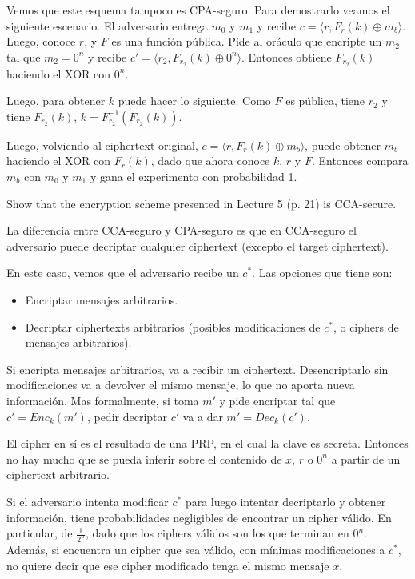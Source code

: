 \documentclass[12pt,addpoints,answers]{exam}
\begin{document}
\begin{questions}
\begin{parts}
\begin{solution}
      Vemos que este esquema tampoco es CPA-seguro. Para demostrarlo veamos el siguiente escenario. El adversario entrega $m_0$ y $m_1$ y recibe $ c = \langle r, F_r(k) \oplus m_b \rangle $. Luego, conoce $r$, y $F$ es una función pública. Pide al oráculo que encripte un $m_2$ tal que $m_2 = 0^n$ y recibe $ c' = \langle r_2, F_{r_2}(k) \oplus 0^n \rangle $. Entonces obtiene $F_{r_2}(k)$ haciendo el XOR con $0^n$.
      
      Luego, para obtener $k$ puede hacer lo siguiente. Como $F$ es pública, tiene $r_2$ y tiene $F_{r_2}(k)$, $k = F_{r_2}^{-1}(F_{r_2}(k))$. 
     
      Luego, volviendo al ciphertext original, $c = \langle r, F_r(k) \oplus m_b \rangle $, puede obtener $m_b$ haciendo el XOR con $F_r(k)$, dado que ahora conoce $k$, $r$ y $F$. Entonces compara $m_b$ con $m_0$ y $m_1$ y gana el experimento con probabilidad 1.
      
    \end{solution}
\end{parts}


\question[10] Show that the encryption scheme presented in Lecture 5 (p. 21) is CCA-secure.
\begin{solution}
  La diferencia entre CCA-seguro y CPA-seguro es que en CCA-seguro el adversario puede decriptar cualquier ciphertext (excepto el target ciphertext).
  
  En este caso, vemos que el adversario recibe un $c^*$. Las opciones que tiene son: 
  \begin{itemize}
    \item Encriptar mensajes arbitrarios.
    \item Decriptar ciphertexts arbitrarios (posibles modificaciones de $c^*$, o ciphers de mensajes arbitrarios). 
  \end{itemize}

  Si encripta mensajes arbitrarios, va a recibir un ciphertext. Desencriptarlo sin modificaciones va a devolver el mismo mensaje, lo que no aporta nueva información. Mas formalmente, si toma $m'$ y pide encriptar tal que $c' = Enc_k(m')$, pedir decriptar $c'$ va a dar $m' = Dec_k(c')$. 

  El cipher en sí es el resultado de una PRP, en el cual la clave es secreta. Entonces no hay mucho que se pueda inferir sobre el contenido de $x$, $r$ o $0^n$ a partir de un ciphertext arbitrario. 

  Si el adversario intenta modificar $c^*$ para luego intentar decriptarlo y obtener información, tiene probabilidades negligibles de encontrar un cipher válido. En particular, de $\frac{1}{2^{n}}$, dado que los ciphers válidos son los que terminan en $0^n$. Además, si encuentra un cipher que sea válido, con mínimas modificaciones a $c^*$, no quiere decir que ese cipher modificado tenga el mismo mensaje $x$. 
  

\end{solution}
\end{questions}
\end{document}
